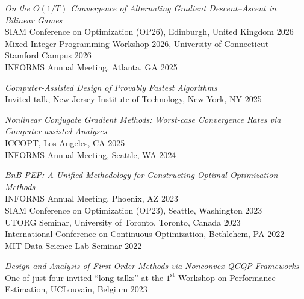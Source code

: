 \documentclass[margin,line,pifont]{./FontsAndCls/custom_res}
\begin{document}
\begin{resume}
\noindent \begin{minipage} {\textwidth}
\textit{On the $O(1/T)$ Convergence of Alternating Gradient Descent–Ascent in Bilinear Games} \\
SIAM Conference on Optimization (OP26), Edinburgh, United Kingdom \hfill 2026 \\
Mixed Integer Programming Workshop 2026, University of Connecticut - Stamford Campus \hfill 2026 \\
INFORMS Annual Meeting, Atlanta, GA  \hfill 2025
\end{minipage}

\noindent \begin{minipage} {\textwidth}
\textit{Computer-Assisted Design of Provably Fastest Algorithms} \\
Invited talk, New Jersey Institute of Technology, New York, NY \hfill 2025
\end{minipage}

\noindent \begin{minipage} {\textwidth}
\textit{Nonlinear Conjugate Gradient Methods: Worst-case Convergence Rates via Computer-assisted Analyses} \\
ICCOPT, Los Angeles, CA  \hfill 2025 \\
INFORMS Annual Meeting, Seattle, WA  \hfill 2024
\end{minipage}



\noindent \begin{minipage} {\textwidth}
\textit{BnB-PEP: A Unified Methodology for Constructing Optimal Optimization Methods} \\
INFORMS Annual Meeting, Phoenix, AZ \hfill  2023 \\
SIAM Conference on Optimization (OP23), Seattle, Washington \hfill 2023 \\
UTORG Seminar, University of Toronto, Toronto, Canada \hfill 2023 \\
International Conference on Continuous Optimization, Bethlehem, PA \hfill 2022 \\
MIT Data Science Lab Seminar \hfill  2022 
\end{minipage}

\noindent \begin{minipage} {\textwidth}
\textit{Design and Analysis of First-Order Methods via Nonconvex QCQP Frameworks} \\
One of just four invited ``long talks'' at the $1^\textrm{st}$ Workshop on Performance Estimation, UCLouvain, Belgium \hfill 2023 
\end{minipage}


\end{resume}
\end{document}
